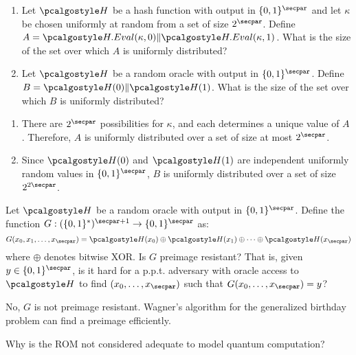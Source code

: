 \begin{exercise}[Optional]
  \begin{enumerate}
    \item Let $\algo{H}$ be a hash function with output in $\{0,1\}^\secpar$ and let $\kappa$ be chosen uniformly at random from a set of size $2^\secpar$. Define $A = \algo{H.Eval}(\kappa, 0) \| \algo{H.Eval}(\kappa, 1)$. What is the size of the set over which $A$ is uniformly distributed?
    \item Let $\algo{H}$ be a random oracle with output in $\{0,1\}^\secpar$. Define $B = \algo{H}(0) \| \algo{H}(1)$. What is the size of the set over which $B$ is uniformly distributed?
  \end{enumerate}
\end{exercise}

\ifsolutions
\begin{mysolution}
  \begin{enumerate}
    \item There are $2^\secpar$ possibilities for $\kappa$, and each determines a unique value of $A$. Therefore, $A$ is uniformly distributed over a set of size at most $2^\secpar$.
    \item Since $\algo{H}(0)$ and $\algo{H}(1)$ are independent uniformly random values in $\{0,1\}^\secpar$, $B$ is uniformly distributed over a set of size $2^{2\secpar}$.
  \end{enumerate}
\end{mysolution}
\fi

\begin{exercise}[Optional]
  Let $\algo{H}$ be a random oracle with output in $\{0,1\}^\secpar$. Define the function $G: (\{0,1\}^*)^{\secpar+1} \rightarrow \{0,1\}^\secpar$ as:
  \[
  G(x_0, x_1, \ldots, x_\secpar) = \algo{H}(x_0) \oplus \algo{H}(x_1) \oplus \cdots \oplus \algo{H}(x_\secpar)
  \]
  where $\oplus$ denotes bitwise XOR. Is $G$ preimage resistant? That is, given $y \in \{0,1\}^\secpar$, is it hard for a p.p.t. adversary with oracle access to $\algo{H}$ to find $(x_0, \ldots, x_\secpar)$ such that $G(x_0, \ldots, x_\secpar) = y$?
\end{exercise}

\ifsolutions
\begin{mysolution}
  No, $G$ is not preimage resistant. Wagner's algorithm for the generalized birthday problem can find a preimage efficiently.
\end{mysolution}

\begin{exercise}[Optional]
  Why is the ROM not considered adequate to model quantum computation?
\end{exercise}
\fi
